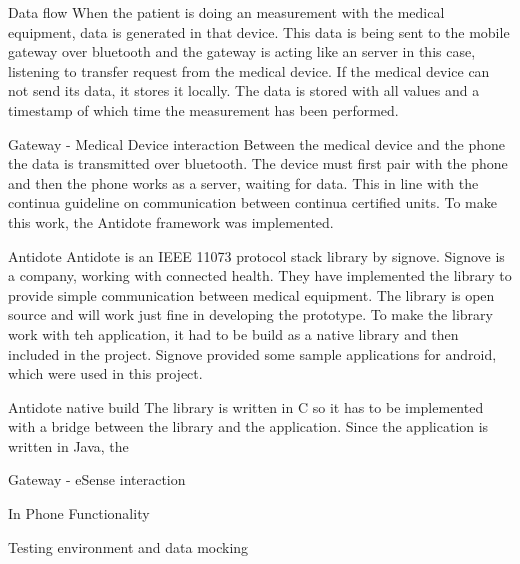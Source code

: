 Data flow
When the patient is doing an measurement with the medical equipment, data is generated in that device. This data is being sent to the mobile gateway over bluetooth and the gateway is acting like an server in this case, listening to transfer request from the medical device. If the medical device can not send its data, it stores it locally. The data is stored with all values and a timestamp of which time the measurement has been performed. 



Gateway - Medical Device interaction
Between the medical device and the phone the data is transmitted over bluetooth. The device must first pair with the phone and then the phone works as a server, waiting for data. This in line with the continua guideline on communication between continua certified units. To make this work, the Antidote framework was implemented.

Antidote
Antidote is an IEEE 11073 protocol stack library by signove. Signove is a company, working with connected health. They have implemented the library to provide simple communication between medical equipment. The library is open source and will work just fine in developing the prototype. To make the library work with teh application, it had to be build as a native library and then included in the project. Signove provided some sample applications for android, which were used in this project.

Antidote native build
The library is written in C so it has to be implemented with a bridge between the library and the application. Since the application is written in Java, the 

Gateway - eSense interaction

In Phone Functionality

Testing environment and data mocking
